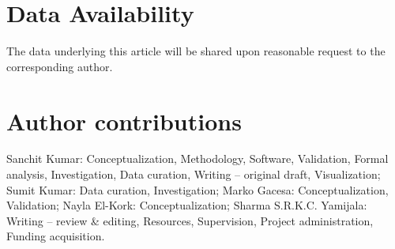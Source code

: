 \documentclass[fleqn,usenatbib]{mnras}
\begin{document}
\section*{Data Availability}
The data underlying this article will be shared upon reasonable request to the corresponding author.

\section*{Author contributions}
Sanchit Kumar: Conceptualization, Methodology, Software, Validation, Formal analysis, Investigation, Data curation, Writing – original draft, Visualization; Sumit Kumar: Data curation, Investigation; Marko Gacesa: Conceptualization, Validation; Nayla El-Kork: Conceptualization; Sharma S.R.K.C. Yamijala: Writing – review \& editing, Resources, Supervision, Project administration, Funding acquisition.












\end{document}
